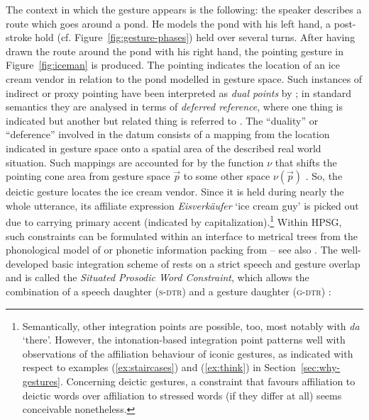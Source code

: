 \documentclass[output=paper,biblatex,babelshorthands,newtxmath,draftmode,colorlinks,citecolor=brown]{langscibook}
\begin{document}
\noindent The context in which the gesture appears is the following: the speaker describes a route
which goes around a pond.  He models the pond with his left hand, a post-stroke hold
(cf. Figure~\ref{fig:gesture-phases}) held over several turns.  After having drawn the route around
the pond with his right hand, the pointing gesture in Figure~\ref{fig:iceman} is produced.  The
pointing indicates the location of an ice cream vendor in relation to the pond modelled in gesture
space.  Such instances of indirect or proxy pointing have been interpreted as
\emph{dual points} by \citet{Goodwin:2003}; in standard semantics they are analysed
in terms of \emph{deferred reference}, where one thing
is indicated but another but related thing is referred to \citep{Quine:1950,Nunberg:1993}.  The
\enquote{duality} or \enquote{deference} involved in the datum consists of a mapping from the
location indicated in gesture space onto a spatial area of the described real world situation.  Such
mappings are accounted for by the function $\nu$ that shifts the pointing cone area from gesture
space $\vec{p}$ to some other space $\nu(\vec{p})$ \citep{Lascarides:Stone:2009:a}.  So, the deictic
gesture locates the ice cream vendor.  Since it is held during nearly the whole utterance, its
affiliate expression \emph{Eisverkäufer} \enquote*{ice cream guy} is picked out due to carrying
primary accent (indicated by capitalization).\footnote{Semantically, other integration points are
  possible, too, most notably with \emph{da} \enquote*{there}. However, the intonation-based
  integration point patterns well with observations of the affiliation behaviour of iconic gestures,
  as indicated with respect to examples (\ref{ex:staircases}) and (\ref{ex:think}) in
  Section~\ref{sec:why-gestures}. Concerning deictic gestures, a constraint that favours affiliation
  to deictic words over affiliation to stressed words (if they differ at all) seems conceivable
  nonetheless.}  Within HPSG, such constraints can be formulated within an interface to metrical
trees from the phonological model of \citet{Klein:2000} or phonetic information packing from
\citet{Engdahl:Vallduvi:1996} -- see also .  The
well-developed basic integration scheme of \citet[]{Alahverdzhieva:Lascarides:Flickinger:2017} rests on a strict speech and gesture overlap and is
called the \emph{Situated Prosodic Word Constraint}, which
allows the combination of a speech daughter (\textsc{s-dtr})  and a gesture daughter
(\textsc{g-dtr}) :%
\end{document}

